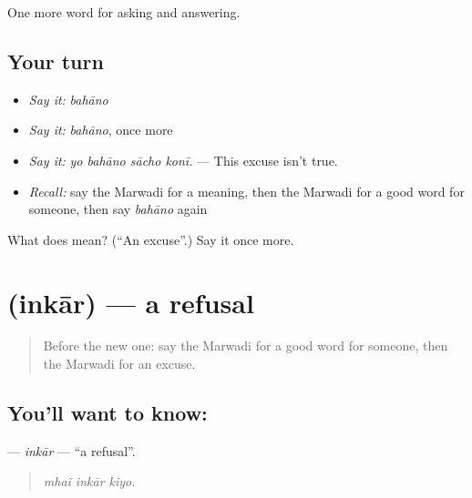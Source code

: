 \begin{grammarlens}[title={What you've built}]
One more word for asking and answering.
\end{grammarlens}

\subsection*{Your turn}
\begin{itemize}
\raggedright
  \item \emph{Say it:} \emph{bahāno}
  \item \emph{Say it:} \emph{bahāno}, once more
  \item \emph{Say it:} \emph{yo bahāno sācho konī.} — This excuse isn't true.
  \item \emph{Recall:} say the Marwadi for a meaning, then the Marwadi for a good word for someone, then say \emph{bahāno} again
\end{itemize}

\begin{tcolorbox}[breakable,colback=teal!4,colframe=teal!35!black,title={Before you move on}]
What does  mean? (\textquotedblleft{}An excuse\textquotedblright{}.) Say it once more.
\end{tcolorbox}
\section[\texorpdfstring{\mw{इनकार} (inkār)}{इनकार (inkār)}]{ (inkār) — a refusal}

\label{lesson:MW-C269-inkar}



\begin{quote}
Before the new one: say the Marwadi for a good word for someone, then the Marwadi for an excuse.
\end{quote}

\subsection*{You'll want to know: }
\textbf{} — \emph{inkār} — \textquotedblleft{}a refusal\textquotedblright{}.

\begin{quote}
  
\end{quote}

\begin{quote}
\emph{mhaĩ inkār kiyo.}
\end{quote}

